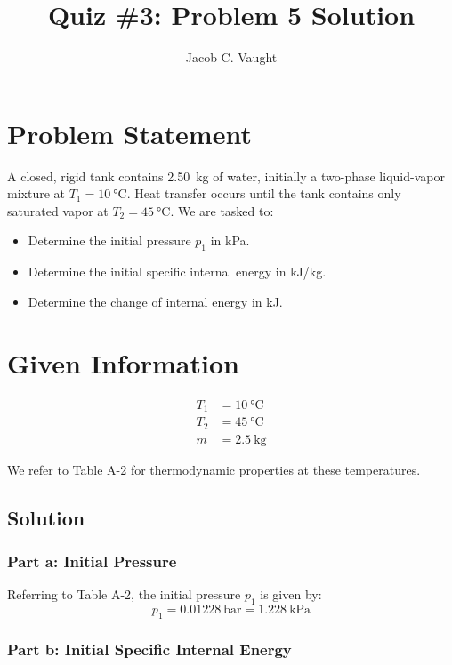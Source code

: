\documentclass[12pt, letterpaper]{article}
\title{Quiz \#3: Problem 5 Solution}
\author{Jacob C. Vaught}
\date{}
\begin{document}
\maketitle

\section*{Problem Statement}

A closed, rigid tank contains \SI{2.50}{\kg} of water, initially a two-phase liquid-vapor mixture at \(T_1 = \SI{10}{\celsius}\). Heat transfer occurs until the tank contains only saturated vapor at \(T_2 = \SI{45}{\celsius}\). We are tasked to:

\begin{itemize}
  \item[a.] Determine the initial pressure \(p_1\) in \si{\kPa}.
  \item[b.] Determine the initial specific internal energy in \si{\kJ/\kg}.
  \item[c.] Determine the change of internal energy in \si{\kJ}.
\end{itemize}

\section*{Given Information}

\begin{align*}
T_1 &= \SI{10}{\celsius} \\
T_2 &= \SI{45}{\celsius} \\
m &= \SI{2.5}{\kg}
\end{align*}

We refer to Table A-2 for thermodynamic properties at these temperatures.

\subsection*{Solution}

\subsubsection*{Part a: Initial Pressure}

Referring to Table A-2, the initial pressure \(p_1\) is given by:
\[
p_1 = \SI{0.01228}{\bar} = \SI{1.228}{\kPa}
\]

\subsubsection*{Part b: Initial Specific Internal Energy}
\end{document}
